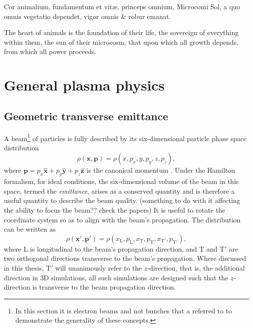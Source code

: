 \begin{savequote}[8cm]
\textlatin{Cor animalium, fundamentum e\longs t vitæ, princeps omnium, Microco\longs mi Sol, a quo omnis vegetatio dependet, vigor omnis \& robur emanat.}

The heart of animals is the foundation of their life, the sovereign of everything within them, the sun of their microcosm, that upon which all growth depends, from which all power proceeds.
\end{savequote}

\chapter{\label{app:1-basics}General plasma physics}

\minitoc

\section{\label{app:1-basics-transverse_emittance}Geometric transverse emittance}
A beam\footnote{In this section it is electron beams and not bunches that a referred to to demonstrate the generality of these concepts.} of particles is fully described by its six-dimensional particle phase space distribution
\begin{equation}
	\rho(\mathbf{x}, \mathbf{p}) = \rho(x,p_x,y,p_y,z,p_z),
\end{equation}
where $\mathbf{p} = p_x \hat{\mathbf{x}} +  p_y \hat{\mathbf{y}} +  p_z \hat{\mathbf{z}}$ is the canonical momentum \cite{mcDonald Methods of emittance measurement 122-132 Springer, 1989}. Under the Hamilton formalism, for ideal conditions, the six-dimensional volume of the beam in this space, termed the \textit{emittance}, arises as a conserved quantity and is therefore a useful quantity to describe the beam quality. 
(something to do with it affecting the ability to focus the beam?? check the papers)
It is useful to rotate the coordinate system so as to align with the beam's propagation. The distribution can be written as
\begin{equation}
	\rho(\mathbf{x'}, \mathbf{p'})  = \rho(x_\mathrm{L},p_\mathrm{L},x_\mathrm{T},p_\mathrm{T},x_\mathrm{T'},p_\mathrm{T'}),
\end{equation}
where L is longitudinal to the beam's propagation direction, and T and T$'$ are two orthogonal directions transverse to the beam's propagation. Where discussed in this thesis, T$'$ will unanimously refer to the $z$-direction, that is, the additional direction in 3D simulations, all such simulations are designed such that the $z$-direction is transverse to the beam propagation direction.

